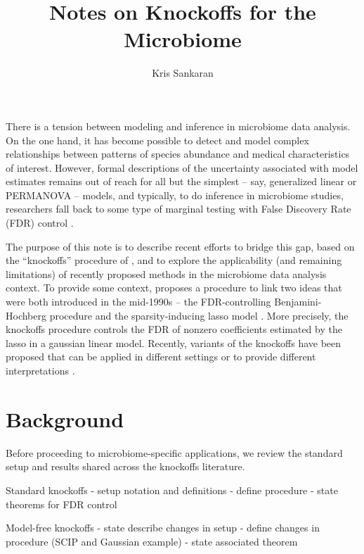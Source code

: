 \documentclass{article}
\title{Notes on Knockoffs for the Microbiome}
\author{Kris Sankaran}
\begin{document}
\maketitle

There is a tension between modeling and inference in microbiome data analysis.
On the one hand, it has become possible to detect and model complex
relationships between patterns of species abundance and medical characteristics
of interest. However, formal descriptions of the uncertainty associated with
model estimates remains out of reach for all but the simplest -- say,
generalized linear or PERMANOVA -- models, and typically, to
do inference in microbiome studies, researchers fall back to some type of
marginal testing with False Discovery Rate (FDR) control \citep{kelly2015power,
  mcmurdie2014waste, benjamini1995controlling, love2014moderated}.

The purpose of this note is to describe recent efforts to bridge this gap, based
on the ``knockoffs'' procedure of \citep{barber2015controlling}, and to explore
the applicability (and remaining limitations) of recently proposed methods in
the microbiome data analysis context. To provide some context,
\citep{barber2015controlling} proposes a procedure to link two ideas that were
both introduced in the mid-1990s -- the FDR-controlling Benjamini-Hochberg
procedure and the sparsity-inducing lasso model \citep{benjamini1995controlling,
  tibshirani1996regression}. More precisely, the knockoffs procedure controls
the FDR of nonzero coefficients estimated by the lasso in a gaussian linear
model. Recently, variants of the knockoffs have been proposed that can be
applied in different settings or to provide different interpretations
\citep{janson2016familywise, candes2016panning, katsevich2017multilayer,
  sesia2017gene, fan2017rank}.

\section{Background}
\label{sec:background}

Before proceeding to microbiome-specific applications, we review the standard
setup and results shared across the knockoffs literature.

Standard knockoffs
- setup notation and definitions
- define procedure
- state theorems for FDR control

Model-free knockoffs
- state describe changes in setup
- define changes in procedure (SCIP and Gaussian example)
- state associated theorem
\end{document}
